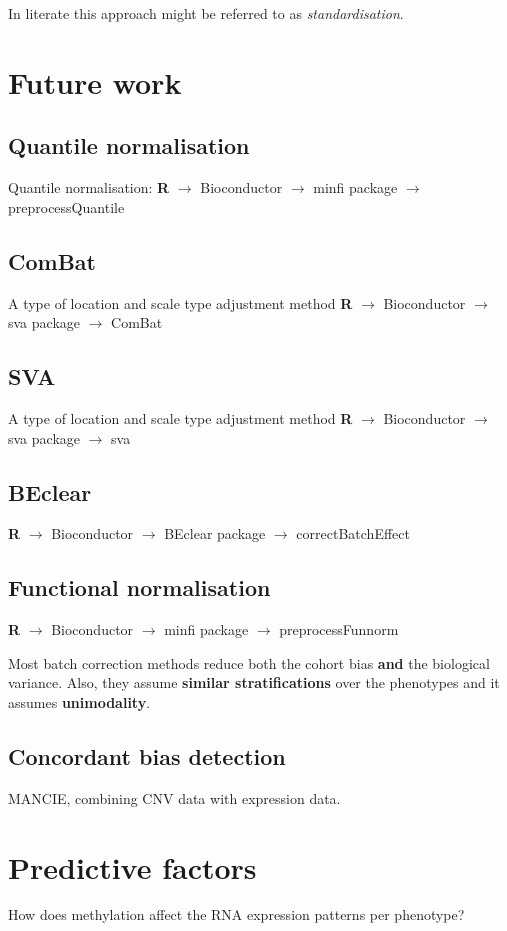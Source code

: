 \documentclass[a4paper,10pt]{article}
\begin{document}
In literate this approach might be referred to as \textit{standardisation}.

\section{Future work}
\subsection{Quantile normalisation}
%
Quantile normalisation: \textbf{R} $\rightarrow$ Bioconductor $\rightarrow$ minfi package $\rightarrow$ preprocessQuantile

\subsection{ComBat}
%
A type of location and scale type adjustment method
\textbf{R} $\rightarrow$ Bioconductor $\rightarrow$ sva package $\rightarrow$ ComBat

\subsection{SVA}
%
A type of location and scale type adjustment method
\textbf{R} $\rightarrow$ Bioconductor $\rightarrow$ sva package $\rightarrow$ sva


\subsection{BEclear}

\textbf{R} $\rightarrow$ Bioconductor $\rightarrow$ BEclear package $\rightarrow$ correctBatchEffect

\subsection{Functional normalisation}

\textbf{R} $\rightarrow$ Bioconductor $\rightarrow$ minfi package $\rightarrow$ preprocessFunnorm

Most batch correction methods reduce both the cohort bias \textbf{and} the biological variance.
Also, they assume \textbf{similar stratifications} over the phenotypes and it assumes \textbf{unimodality}.

\subsection{Concordant bias detection}
MANCIE, combining CNV data with expression data.

\section{Predictive factors}
%
How does methylation affect the RNA expression patterns per phenotype?






\end{document}
